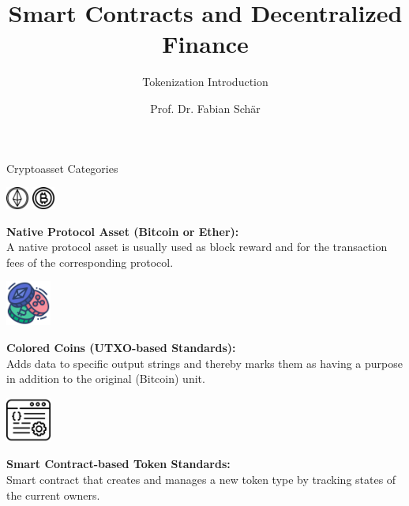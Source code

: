 \documentclass[handout]{beamer}
\title{Smart Contracts and Decentralized Finance}
\subtitle{Tokenization Introduction}
\author{Prof. Dr. Fabian Schär}
\institute{University of Basel}
\begin{document}
\thispagestyle{empty}
\begin{frame}[noframenumbering]
	\titlepage
\end{frame}


\begin{frame}{Cryptoasset Categories}
	\begin{minipage}{0.2\textwidth}
			\begin{center}
				\includegraphics[height=2em]{../assets/images/ethertoken}
				\includegraphics[height=2em]{../assets/images/bitcointoken}
			\end{center}
		\end{minipage}
		\begin{minipage}{0.7\textwidth}
			\textbf{Native Protocol Asset (Bitcoin or Ether):} \\
			A native protocol asset is usually used as block reward and for the transaction fees of the corresponding protocol.
		\end{minipage}
	
		\pause
		\vspace{1.5 em}
		\begin{minipage}{0.2\textwidth}
			\begin{center}
				\includegraphics[height=4em]{../assets/images/colored_coins}
			\end{center}
		\end{minipage}
		\begin{minipage}{0.7\textwidth}
			\textbf{Colored Coins (UTXO-based Standards):} \\
			Adds data to specific output strings and thereby marks them as having a purpose in addition to the original (Bitcoin) unit.
		\end{minipage}
	
		\pause
		\vspace{1.5 em}
		\begin{minipage}{0.2\textwidth}
			\begin{center}
				\includegraphics[height=4em]{../assets/images/CA}
			\end{center}
		\end{minipage}
		\begin{minipage}{0.7\textwidth}
			\textbf{Smart Contract-based Token Standards:} \\
			Smart contract that creates and manages a new token type by tracking states of the current owners.	
		\end{minipage}

\end{frame}
\end{document}
